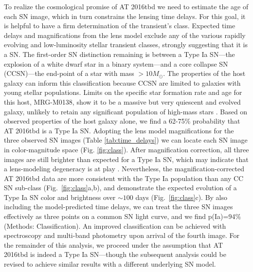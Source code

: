 \documentclass[12pt]{article}
\def\SNABC{AT 2016tbd\xspace}
\begin{document}
To realize the cosmological promise of \SNABC 
we need to estimate the age of each SN image, which in turn constrains the lensing time delays. For this
goal, it is helpful to have a firm determination of the transient’s class. Expected time delays and magnifications from the lens model exclude any of the various rapidly evolving and low-luminosity stellar transient classes, strongly suggesting that it is a SN. The first-order SN distinction remaining is between a Type Ia SN---the explosion of a white dwarf star in a binary system---and a core collapse SN (CCSN)---the end-point of a star with mass $>10 M_{\odot}$. 
The properties of the host galaxy can inform this classification because CCSN are limited to galaxies with young stellar populations. Limits on the specific star formation rate and age for this host, MRG-M0138, show it to be a massive but very quiescent and evolved galaxy, %
unlikely to retain any significant population of high-mass stars \cite{newman_resolving_2018}. Based on observed properties of the host galaxy alone, we find a 62-75\% probability that \SNABC is a Type Ia SN. Adopting the lens model magnifications for the three observed SN images (Table \ref{tab:time_delays}) we can locate each SN image in color-magnitude space (Fig. \ref{fig:class}). After magnification correction, all three images are still brighter than expected for a Type Ia SN, which may indicate that a lens-modeling degeneracy is at play \cite{falco_model-dependent_1985, schneider_source-position_2014}. Nevertheless, the magnification-corrected \SNABC data are more consistent with the Type Ia population than any CC SN sub-class (Fig.~\ref{fig:class}a,b), and demonstrate the expected evolution of a Type Ia SN color and brightness over $\sim 100$ days (Fig.~\ref{fig:class}c).
By also including the model-predicted time delays, we can treat the three SN images effectively as three points on a common SN light curve, and we find p(Ia)=94\% 
(Methods: Classification).
An improved classification can be achieved  with spectroscopy and multi-band photometry upon arrival of the fourth image.  For the remainder of this analysis, we proceed under the assumption that \SNABC is indeed a Type Ia SN---though the subsequent analysis could be revised to achieve similar results with a different underlying SN model.
\end{document}

